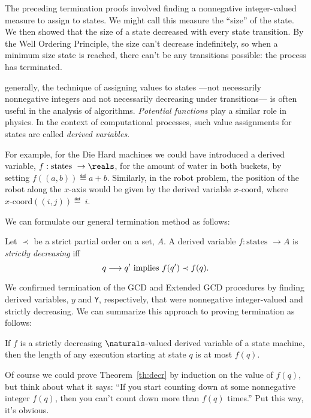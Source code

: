 The preceding termination proofs involved finding a nonnegative
integer-valued measure to assign to states.  We might call this measure
the ``size'' of the state.  We then showed that the size of a state
decreased with every state transition.  By the Well Ordering Principle,
the size can't decrease indefinitely, so when a minimum size state is
reached, there can't be any transitions possible: the process has
terminated.

 generally, the technique of assigning
values to states ---not necessarily nonnegative integers and not necessarily
decreasing under transitions--- is often useful in the analysis of
algorithms.  \emph{Potential functions} play a similar role in physics.
In the context of computational processes, such value assignments for
states are called \emph{derived variables}.

For example, for the Die Hard machines we could have introduced a derived
variable, $f: \text{states } \to \reals$, for the amount of water in both
buckets, by setting $f((a, b)) \eqdef a + b$.  Similarly, in the robot
problem, the position of the robot along the $x$-axis would be given by
the derived variable $x\text{-coord}$, where $x\text{-coord}((i, j))
\eqdef~i$.

We can formulate our general termination method as follows:

\begin{definition}
  Let $\prec$ be a strict partial order on a set, $A$.  A derived variable
  $f : \text{states } \to A$ is \emph{strictly decreasing} iff
\[
q \mathrel{\longrightarrow} q' \text{  implies  } f(q') \prec f(q).
\]
\end{definition}

We confirmed termination of the GCD and Extended GCD procedures by finding
derived variables, $y$ and \texttt{Y}, respectively, that were nonnegative
integer-valued and strictly decreasing.  We can summarize this approach to
proving termination as follows:
\begin{theorem}
\label{th:decr}
If $f$ is a strictly decreasing $\naturals$-valued derived variable of a
state machine, then the length of any execution starting at state $q$ is
at most $f(q)$.
\end{theorem}

Of course we could prove Theorem~\ref{th:decr} by induction on the value
of $f(q)$, but think about what it says: ``If you start counting down at
some nonnegative integer $f(q)$, then you can't count down more than
$f(q)$ times.''  Put this way, it's obvious.

